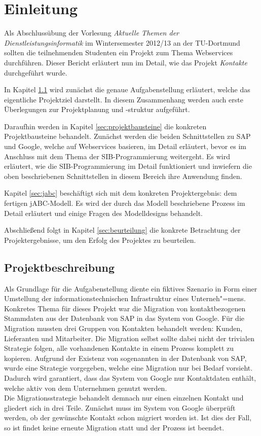 \javalstset{}{}
\section{Einleitung}

Als Abschlussübung der Vorlesung \emph{Aktuelle Themen der Dienstleistungsinformatik} im Wintersemester
 2012/13 an der TU-Dortmund sollten die teilnehmenden Studenten ein Projekt zum Thema Webservices
 durchführen. Dieser Bericht erläutert nun im Detail, wie das Projekt \textit{Kontakte} durchgeführt wurde.

In Kapitel \ref{sec:einleitung} wird zunächst die genaue Aufgabenstellung erläutert, welche das
 eigentliche Projektziel darstellt. In diesem Zusammenhang werden auch erste Überlegungen zur Projektplanung
 und -struktur aufgeführt.

Daraufhin werden in Kapitel \ref{sec:projektbausteine} die konkreten Projektbausteine behandelt. Zunächst
 werden die beiden Schnittstellen zu SAP und Google, welche auf Webservices basieren, im Detail erläutert,
 bevor es im Anschluss mit dem Thema der SIB-Programmierung weitergeht. Es wird erläutert, wie die
 SIB-Programmierung im Detail funktioniert und inwiefern die oben beschriebenen Schnittstellen in diesem
 Bereich ihre Anwendung finden.

Kapitel \ref{sec:jabc} beschäftigt sich mit dem konkreten Projektergebnis: dem fertigen jABC-Modell.
 Es wird der durch das Modell beschriebene Prozess im Detail erläutert und einige Fragen des Modelldesigns behandelt.

Abschließend folgt in Kapitel \ref{sec:beurteilung} die konkrete Betrachtung der Projektergebnisse,
 um den Erfolg des Projektes zu beurteilen. 


\subsection{Projektbeschreibung}
\label{sec:einleitung}
Als Grundlage für die Aufgabenstellung diente ein fiktives Szenario in Form einer Umstellung der
 informationstechnischen Infrastruktur eines Unterneh"=mens. Konkretes Thema für dieses Projekt war die
 Migration von kontaktbezogenen Stammdaten aus der Datenbank von SAP in das System von Google.
Für die Migration mussten drei Gruppen von Kontakten behandelt werden: Kunden, Lieferanten und Mitarbeiter.
Die Migration selbst sollte dabei nicht der trivialen Strategie folgen, alle vorhandenen Kontakte
 in einem Prozess komplett zu kopieren.
Aufgrund der Existenz von sogenannten  in der Datenbank von SAP, wurde
 eine Strategie vorgegeben, welche eine Migration nur bei Bedarf vorsieht.
Dadurch wird garantiert, dass das System von Google nur Kontaktdaten enthält, welche aktiv von dem
 Unternehmen genutzt werden.\\
Die Migrationsstrategie behandelt demnach nur einen einzelnen Kontakt und gliedert sich in drei Teile.
Zunächst muss im System von Google überprüft werden, ob der gewünschte Kontakt schon migriert worden ist.
Ist dies der Fall, so ist findet keine erneute Migration statt und der Prozess ist beendet.

